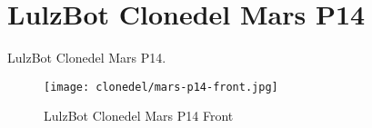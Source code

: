 %
%
%
%
%

\section{LulzBot Clonedel Mars P14}
LulzBot Clonedel Mars P14.

\begin{figure}[h!]
\texttt{[image: clonedel/mars-p14-front.jpg]}
 \caption{LulzBot Clonedel Mars P14 Front}
 \label{fig:clonedel-mars-p14-front}
\end{figure}


